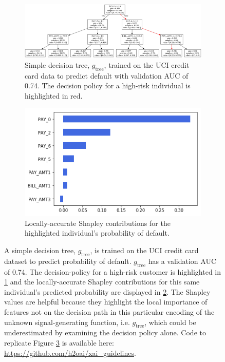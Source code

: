 \documentclass[sigconf]{acmart}
\begin{document}
\begin{figure}[htb!]
	\begin{subfigure}{.55\textwidth}
		\includegraphics[height=.45\linewidth, width=1.15\linewidth]{img/dt.png}
  		\caption{Simple decision tree, $g_{\text{tree}}$, trained on the UCI credit card data to predict default with validation AUC of 0.74. The decision policy for a high-risk individual is highlighted in red.}
  		\label{fig:dt}
	\end{subfigure}\hspace*{40pt}
	\vspace{25pt}\begin{subfigure}{.45\textwidth}
  		\includegraphics[height=.5\linewidth, width=.8\linewidth]{img/shap.png}
		\caption{Locally-accurate Shapley contributions for the\\ highlighted individual's probability of default.}
  		\label{fig:shap}
	\end{subfigure}\vspace{-30pt}
	\caption{A simple decision tree, $g_{\text{tree}}$, is trained on the UCI credit card dataset to predict probability of default. $g_{\text{tree}}$ has a validation AUC of 0.74. The decision-policy for a high-risk customer is highlighted in \ref{fig:dt} and the locally-accurate Shapley contributions for this same individual's predicted probability are displayed in \ref{fig:shap}. The Shapley values are helpful because they highlight the local importance of features not on the decision path in this particular encoding of the unknown signal-generating function, i.e. $g_{\text{tree}}$, which could be underestimated by examining the decision policy alone. Code to replicate Figure \ref{fig:dt_shap} is available here: \url{https://github.com/h2oai/xai_guidelines}.} 
	\label{fig:dt_shap}
\end{figure}
\end{document}

